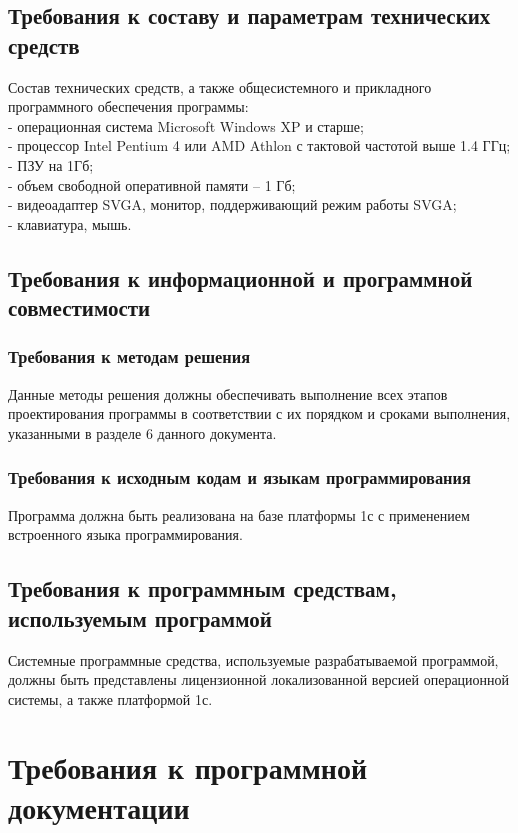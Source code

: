\documentclass[14pt]{extarticle}
\begin{document}
    \subsection{Требования к составу и параметрам технических средств}
    Состав технических средств, а также общесистемного и прикладного программного обеспечения программы:\\
    - операционная система Microsoft Windows XP и старше;\\
    - процессор Intel Pentium 4 или AMD Athlon с тактовой частотой выше 1.4 ГГц;\\
    - ПЗУ на 1Гб;\\
    - объем свободной оперативной памяти – 1 Гб;\\
    - видеоадаптер SVGA, монитор, поддерживающий режим работы SVGA; \\
    - клавиатура, мышь.

    \subsection{Требования к информационной и программной совместимости}
        \subsubsection{Требования к методам решения}
        
        Данные методы решения должны обеспечивать выполнение всех этапов проектирования программы в соответствии с их порядком и сроками выполнения, указанными в разделе 6 данного документа.
        \subsubsection{Требования к исходным кодам и языкам программирования}
        Программа должна быть реализована на базе платформы 1с с применением встроенного языка программирования.
        
    \subsection{Требования к программным средствам, используемым программой}
    Системные программные средства, используемые разрабатываемой программой, должны быть представлены лицензионной локализованной версией операционной системы, а также платформой 1с.
    
\section{Требования к программной документации}
\end{document}
